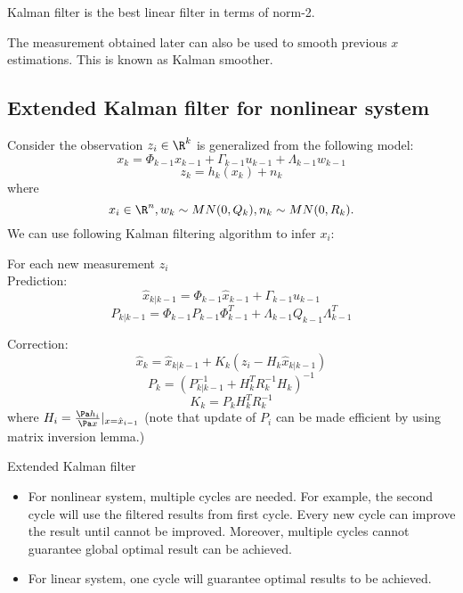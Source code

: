 \begin{refsection}
\begin{remark} Kalman filter is the best linear filter in terms of norm-2.
\end{remark}



\begin{remark}
	The measurement obtained later can also be used to smooth previous $x$ estimations. This is known as Kalman smoother.\cite{sarkka2013bayesian}
\end{remark}

\subsection{Extended Kalman filter for nonlinear system}
Consider the observation $z_i \in \R^k$ is generalized from the following model:
$$x_{k} = \Phi_{k-1} x_{k-1} + \Gamma_{k-1}u_{k-1} + \Lambda_{k-1}w_{k-1}$$
$$z_k = h_k(x_k) + n_k$$
where $$x_i\in \R^n, w_k\sim MN(0,Q_k),n_k\sim MN(0,R_k).$$ We can use following Kalman filtering algorithm to infer $x_i$:\cite[342]{stengel2012optimal}
\begin{algorithm}[H]
	\SetAlgoLined
		For each new measurement $z_i$\\
		Prediction:
		$$\hat{x}_{k|k-1} = \Phi_{k-1}\hat{x}_{k-1} + \Gamma_{k-1}u_{k-1}$$
		$$P_{k|k-1} = \Phi_{k-1}P_{k-1}\Phi_{k-1}^T + \Lambda_{k-1}Q_{k-1}\Lambda_{k-1}^T$$
		
		Correction:
		$$\hat{x}_k = \hat{x}_{k|k-1} + K_k(z_i - H_k \hat{x}_{k|k-1})$$
		$$P_k = (P_{k|k-1}^{-1} + H_k^TR_k^{-1}H_k)^{-1}$$
		$$K_k = P_kH_k^TR_k^{-1}$$
	where $H_i = \frac{\Pa h_i}{\Pa x}|_{x=\hat{x}_{i-1}}$	
	(note that update of $P_i$ can be made efficient by using matrix inversion lemma.)\\

	\caption{Extended Kalman filter}
\end{algorithm}

\begin{remark}\hfill
	\begin{itemize}
		\item For nonlinear system, multiple cycles are needed. For example, the second cycle will use the filtered results from first cycle. Every new cycle can improve the result until cannot be improved. Moreover, multiple cycles cannot guarantee global optimal result can be achieved.
		\item For linear system, one cycle will guarantee optimal results to be achieved. 
	\end{itemize}
\end{remark}



\end{refsection}
